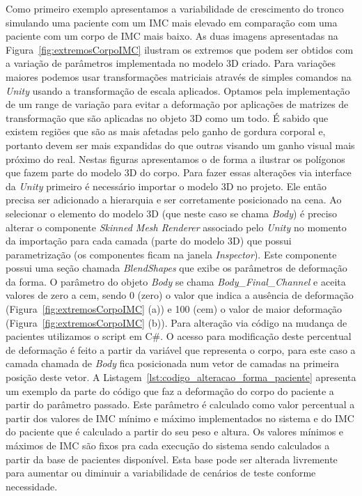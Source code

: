 Como primeiro exemplo apresentamos a variabilidade de crescimento do tronco simulando uma paciente com um \acrshort{IMC} mais elevado em comparação com uma paciente com um corpo de \acrshort{IMC} mais baixo. As duas imagens apresentadas na Figura~\ref{fig:extremosCorpoIMC} ilustram os extremos que podem ser obtidos com a variação de parâmetros implementada no modelo 3D criado. Para variações maiores podemos usar transformações matriciais através de simples comandos na \textit{Unity} usando a transformação de escala aplicados. Optamos pela implementação de um range de variação para evitar a deformação por aplicações de matrizes de transformação que são aplicadas no objeto 3D como um todo. É sabido que existem regiões que são as mais afetadas pelo ganho de gordura corporal e, portanto devem ser mais expandidas do que outras visando um ganho visual mais próximo do real. Nestas figuras apresentamos o  de forma a ilustrar os polígonos que fazem parte do modelo 3D do corpo. Para fazer essas alterações via interface da \textit{Unity} primeiro é necessário importar o modelo 3D no projeto. Ele então precisa ser adicionado a hierarquia e ser corretamente posicionado na cena. Ao selecionar o elemento do modelo 3D (que neste caso se chama \textit{Body}) é preciso alterar o componente \textit{Skinned Mesh Renderer} associado pelo \textit{Unity} no momento da importação para cada camada (parte do modelo 3D) que possui parametrização (os componentes ficam na janela \textit{Inspector}). Este componente possui uma seção chamada \textit{BlendShapes} que exibe os parâmetros de deformação da forma. O parâmetro do objeto \textit{Body} se chama \textit{Body\_Final\_Channel} e aceita valores de zero a cem, sendo 0 (zero) o valor que indica a ausência de deformação (Figura~\ref{fig:extremosCorpoIMC} (a)) e 100 (cem) o valor de maior deformação (Figura~\ref{fig:extremosCorpoIMC} (b)). Para alteração via código na mudança de pacientes utilizamos o script em C\#. O acesso para modificação deste percentual de deformação é feito a partir da variável que representa o corpo, para este caso a camada chamada de \textit{Body} fica posicionada num vetor de camadas na primeira posição deste vetor. A Listagem~\ref{lst:codigo_alteracao_forma_paciente} apresenta um exemplo da parte do código que faz a deformação do corpo do paciente a partir do parâmetro passado. Este parâmetro é calculado como valor percentual a partir dos valores de \acrshort{IMC} mínimo e máximo implementados no sistema e do \acrshort{IMC} do paciente que é calculado a partir do seu peso e altura. Os valores mínimos e máximos de IMC são fixos pra cada execução do sistema sendo calculados a partir da base de pacientes disponível. Esta base pode ser alterada livremente para aumentar ou diminuir a variabilidade de cenários de teste conforme necessidade.

